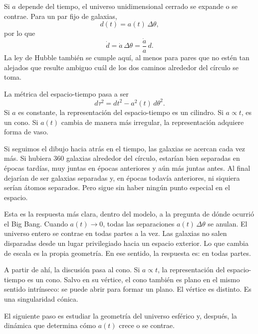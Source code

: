 Si \(a\) depende del tiempo, el universo unidimensional cerrado se expande o se contrae. Para un par fijo de galaxias,
\begin{equation}
d(t)=a(t)\,\Delta\theta,
\end{equation}
por lo que
\begin{equation}
\dot d=\dot a\,\Delta\theta
      =\frac{\dot a}{a}\,d.
\end{equation}
La ley de Hubble también se cumple aquí, al menos para pares que no estén tan alejados que resulte ambiguo cuál de los dos caminos alrededor del círculo se toma.

La métrica del espacio-tiempo pasa a ser
\begin{equation}
d\tau^2=dt^2-a^2(t)\,d\theta^2.
\end{equation}
Si \(a\) es constante, la representación del espacio-tiempo es un cilindro. Si \(a\propto t\), es un cono. Si \(a(t)\) cambia de manera más irregular, la representación adquiere forma de vaso.

Si seguimos el dibujo hacia atrás en el tiempo, las galaxias se acercan cada vez más. Si hubiera \(360\) galaxias alrededor del círculo, estarían bien separadas en épocas tardías, muy juntas en épocas anteriores y aún más juntas antes. Al final dejarían de ser galaxias separadas y, en épocas todavía anteriores, ni siquiera serían átomos separados. Pero sigue sin haber ningún punto especial en el espacio.

Esta es la respuesta más clara, dentro del modelo, a la pregunta de dónde ocurrió el Big Bang. Cuando \(a(t)\to 0\), todas las separaciones \(a(t)\,\Delta\theta\) se anulan. El universo entero se contrae en todas partes a la vez. Las galaxias no salen disparadas desde un lugar privilegiado hacia un espacio exterior. Lo que cambia de escala es la propia geometría. En ese sentido, la respuesta es: en todas partes.

\begin{classroomqa}\end{classroomqa}

A partir de ahí, la discusión pasa al cono. Si \(a\propto t\), la representación del espacio-tiempo es un cono. Salvo en su vértice, el cono también es plano en el mismo sentido intrínseco: se puede abrir para formar un plano. El vértice es distinto. Es una singularidad cónica.

El siguiente paso es estudiar la geometría del universo esférico y, después, la dinámica que determina cómo \(a(t)\) crece o se contrae.
